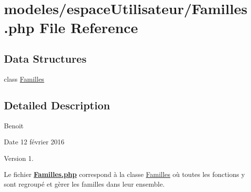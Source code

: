 \hypertarget{_familles_8php}{}\section{modeles/espace\+Utilisateur/\+Familles.php File Reference}
\label{_familles_8php}
\subsection*{Data Structures}
\begin{DoxyCompactItemize}
\item 
class \hyperlink{class_familles}{Familles}
\end{DoxyCompactItemize}


\subsection{Detailed Description}
Benoit \begin{DoxyDate}{Date}
12 février 2016 
\end{DoxyDate}
\begin{DoxyVersion}{Version}
1.
\end{DoxyVersion}
Le fichier {\bfseries \hyperlink{_familles_8php}{Familles.\+php}} correspond à la classe \hyperlink{class_familles}{Familles} où toutes les fonctions y sont regroupé et gèrer les familles dans leur ensemble. 